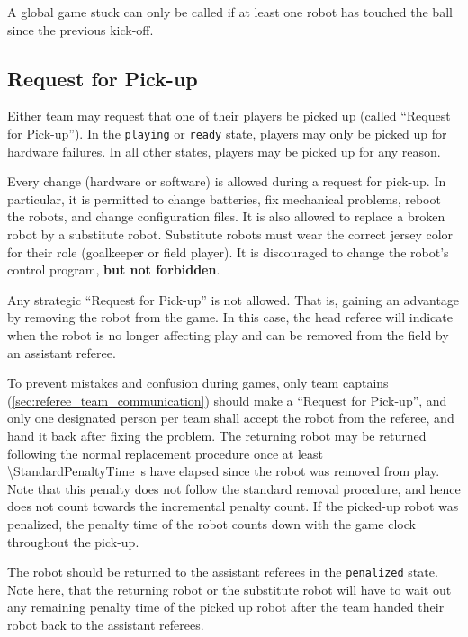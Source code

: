 A global game stuck can only be called if at least one robot has touched the ball since the previous kick-off.

\subsection{Request for Pick-up}
\label{sec:request_for_pickup}

Either team may request that one of their players be picked up (called ``Request for Pick-up'').
In the \texttt{playing} or \texttt{ready} state, players may only be picked up for hardware failures.
In all other states, players may be picked up for any reason.

Every change (hardware or software) is allowed during a request for pick-up.
In particular, it is permitted to change batteries, fix mechanical problems, reboot the robots, and change configuration files.
It is also allowed to replace a broken robot by a substitute robot.
Substitute robots must wear the correct jersey color for their role (goalkeeper or field player).
It is discouraged to change the robot's control program, \textbf{but not forbidden}.

Any strategic ``Request for Pick-up'' is not allowed.
That is, gaining an advantage by removing the robot from the game.
In this case, the head referee will indicate when the robot is no longer affecting play and can be removed from the field by an assistant referee.

To prevent mistakes and confusion during games, only team captains (\cf \cref{sec:referee_team_communication}) should make a ``Request for Pick-up'', and only one designated person per team shall accept the robot from the referee, and hand it back after fixing the problem.
The returning robot may be returned following the normal replacement procedure once at least \qty{\StandardPenaltyTime}{\second} have elapsed since the robot was removed from play.
Note that this penalty does not follow the standard removal procedure, and hence does not count towards the incremental penalty count.
If the picked-up robot was penalized, the penalty time of the robot counts down with the game clock throughout the pick-up.

The robot should be returned to the assistant referees in the \texttt{penalized} state.
Note here, that the returning robot or the substitute robot will have to wait out any remaining penalty time of the picked up robot after the team handed their robot back to the assistant referees.

